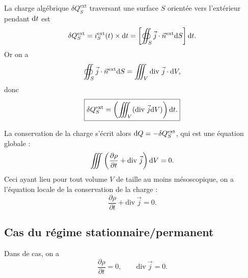         La charge algébrique $\delta Q_{S}^{\text{ext}}$ traversant une surface $S$ orientée vers l'extérieur pendant $\mathrm{d} t$ est 
        \begin{equation}
            \delta Q_S^{\text{ext}}=i_{S}^{\text{ext}}(t)\times\mathrm{d} t=\left[
                \oiint_{S}\vec{j}\cdot\vec{n}^{\text{ext}}\mathrm{d} S
            \right]\mathrm{d} t.
        \end{equation}
        Or on a 
        \begin{equation}
            \oiint_{S}\vec{j}\cdot\vec{n}^{\text{ext}}\mathrm{d} S=\iiint_{V}\mathrm{div}~\vec{j}\cdot\mathrm{d} V,
        \end{equation}
        donc
        \begin{equation}
            \boxed{
                \delta Q_S^{\text{ext}}=\left(
                    \iiint_{V}(\mathrm{div}~\vec{j}\mathrm{d} V)
                \right)\mathrm{d} t.
            }
        \end{equation}

        La conservation de la charge s'écrit alors $\mathrm{d} Q=-\delta Q_S^{\text{ext}}$, qui est une équation globale :
        \begin{equation}
            \iiint\left(\frac{\partial\rho}{\partial t}+\mathrm{div}~\vec{j}\right)\mathrm{d} V=0.
        \end{equation}
        Ceci ayant lieu pour tout volume $V$ de taille au moins mésoscopique, on a l'équation locale de la conservation de la charge :
        \begin{equation}
            \boxed{
                \frac{\partial\rho}{\partial t}+\mathrm{div}~\vec{j}=0.
            }
        \end{equation}

    \subsection{Cas du régime stationnaire/permanent}

        Dans de cas, on a 
        \begin{equation}
            \boxed{
                \dfrac{\partial\rho}{\partial t}=0,\qquad\mathrm{div}~\vec{j}=0.
            }
        \end{equation}

